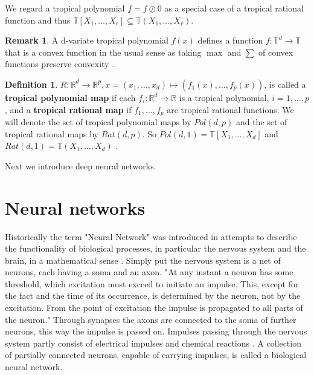 \documentclass{article}
\theoremstyle{definition}
\newtheorem{definition}[theorem]{Definition}
\newtheorem{remark}[theorem]{Remark}
\begin{document}
We regard a tropical polynomial $f=f \oslash 0$ as a special case of a tropical rational function and thus $\mathbb{T}[X_1, \dots , X_r] \subseteq \mathbb{T}(X_1, \dots , X_r)$. \cite[p.~3]{zhang2018tropical}

\begin{remark}
A d-variate tropical polynomial $f(x)$ defines a function $f: \mathbb{T}^{d} \to \mathbb{T}$ that is a convex function in the usual sense as taking $\max$ and $\sum$ of convex functions preserve convexity \cite{boyd2004convex}.
\end{remark}

\begin{definition}
$R : \mathbb{R}^{d} \to \mathbb{R}^{p}, x = (x_1, \dots , x_d)\mapsto (f_1(x), \dots , f_p(x))$, is called a \textbf{tropical polynomial map} if each $f_i : \mathbb{R}^{d} \to \mathbb{R}$ is a tropical polynomial, $i = 1, \dots , p$, and a \textbf{tropical rational map} if $f_1, \dots , f_p$ are tropical rational functions. We will denote the set of tropical polynomial maps by $Pol(d, p)$ and the set of tropical rational maps by $Rat(d, p)$. So $Pol(d, 1) = \mathbb{T}[X_1, \dots , X_d]$ and $Rat(d, 1) = \mathbb{T}(X_1, \dots , X_d)$ \cite[p.~3]{zhang2018tropical}.
\end{definition}

Next we introduce deep neural networks.

\newpage

\section{Neural networks}
\label{sec:neural_networks}
Historically the term "Neural Network" was introduced in attempts to describe the functionality of biological processes, in particular the nervous system and the brain, in a mathematical sense \cite{mcculloch1943logical, widrow1960adaptive, rumelhart1986learning}. Simply put the nervous system is a net of neurons, each having a soma and an axon. "At any instant a neuron has some threshold, which excitation must exceed to initiate an impulse. This, except for the fact and the time of its occurrence, is determined by the neuron, not by the excitation. From the point of excitation the impulse is propagated to all parts of the neuron." \cite[p.~1]{mcculloch1943logical} Through synapses the axons are connected to the soma of further neurons, this way the impulse is passed on. Impulses passing through the nervous system partly consist of electrical impulses and chemical reactions \cite{palay1956synapses}. A collection of partially connected neurons, capable of carrying impulses, is called a biological neural network.
\end{document}
